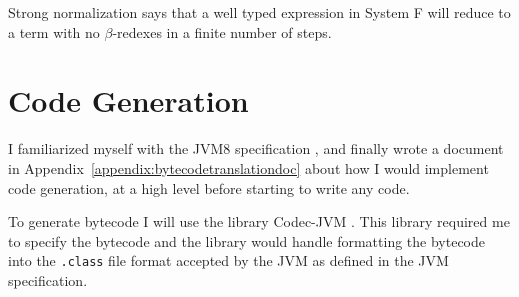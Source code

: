 \documentclass[float=false, crop=false]{standalone}
\begin{document}
\begin{displayquote} Strong normalization says that a well typed expression in System F will
reduce to a term with no $\beta$-redexes in a finite number of steps.
\end{displayquote}

\section{Code Generation}

I familiarized myself with the JVM8 specification \cite{jvm-spec8}, and finally wrote a document in Appendix~\ref{appendix:bytecodetranslationdoc} 
about how I would implement code generation, 
at a high level before starting to write any code.

To generate bytecode I will use the library Codec-JVM \cite{codec-jvm-link}. This library 
required me to specify the bytecode and the library would handle formatting the bytecode into
the \texttt{.class} file format accepted by the JVM as defined in the JVM specification. 
\end{document}

